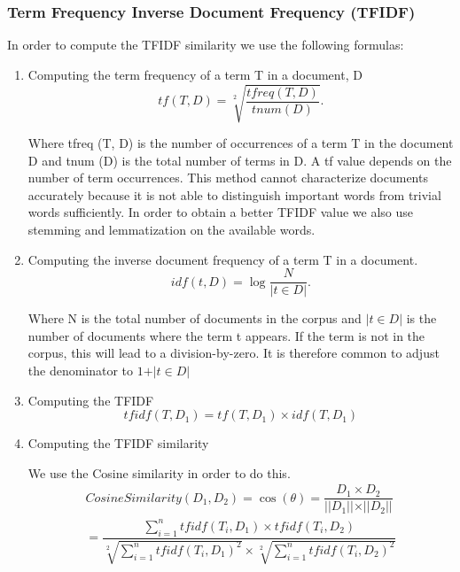 \subsubsection{Term Frequency Inverse Document Frequency (TFIDF)}
\label{sec:TFIDF}

In order to compute the TFIDF similarity we use the following formulas:
\begin{enumerate}
	\item Computing the term frequency of a term T in a document, D 	
	\begin{equation}
	tf(T, D) = \sqrt[2]{\dfrac{tfreq(T, D)}{tnum(D)}}.
	\end{equation}

		Where tfreq (T, D) is the number of occurrences of a term T in the document D and tnum (D) is the total number of terms in D. A tf value depends on the number of term occurrences. This method cannot characterize documents accurately because it is not able to distinguish important words from trivial words sufficiently. In order to obtain a better TFIDF value we also use stemming and lemmatization on the available words. 
	\item Computing the inverse document frequency of a term T in a document.
	\begin{equation}
	idf(t, D) = \log{\dfrac{N}{\vert t \in D \vert}}.
	\end{equation}

		Where N is the total number of documents in the corpus and $\vert{t \in D }\vert$ is the number of documents where the term t appears. If the term is not in the corpus, this will lead to a division-by-zero. It is therefore common to adjust the denominator to $1 + \vert{t \in D}\vert$

	\item Computing the TFIDF \cite{hybrid-recomm}
	\begin{equation}
		tfidf (T, D_{1}) = tf (T, D_{1}) \times idf(T,D_{1})
	\end{equation}
	\item Computing the TFIDF similarity

		We use the Cosine similarity in order to do this.
		\begin{equation}
			\begin{split}
				Cosine Similarity(D_{1},D_{2}) = \cos (\theta) = \dfrac{D_{1} \times D_{2}}{\vert\vert D_{1} \vert\vert \times  \vert\vert D_{2} \vert\vert}\\
				= \dfrac {\sum_{i=1}^{n} tfidf(T_{i}, D_{1}) \times tfidf(T_{i}, D_{2})} {\sqrt[2]{\sum_{i=1}^{n} tfidf(T_{i},D_{1} )^{2}} \times \sqrt[2]{\sum_{i=1}^{n} tfidf(T_{i},D_{2} )^{2}}} 
			\end{split}
		\end{equation}
		

\end{enumerate}
